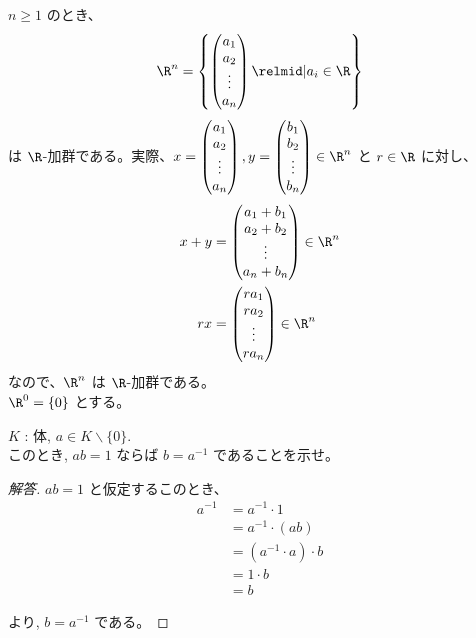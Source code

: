 \documentclass[article,paper=a4paper]{jlreq}
\begin{document}
\begin{ex}
  $n \geq 1$ のとき、
  \[\R^n = \left\{ \begin{pmatrix} a_1 \\ a_2 \\ \vdots \\ a_n \end{pmatrix} \relmid | a_i \in \R \right\}\]
  は $\R$-加群である。実際、$x = \begin{pmatrix} a_1 \\ a_2 \\ \vdots \\ a_n \end{pmatrix}, y = \begin{pmatrix} b_1 \\ b_2 \\ \vdots \\ b_n \end{pmatrix} \in \R^n$ と $r \in \R$ に対し、
\begin{align*}
  x + y &= \begin{pmatrix} a_1 + b_1 \\ a_2 + b_2 \\ \vdots \\ a_n + b_n \end{pmatrix} \in \R^n \\
  rx &= \begin{pmatrix} ra_1 \\ ra_2 \\ \vdots \\ ra_n \end{pmatrix} \in \R^n
\end{align*}
なので、$\R^n$ は $\R$-加群である。\\
\indent $\R^0 = \{0\}$ とする。
\end{ex}


\begin{exe}
  \quad $K$ : 体, $a \in K\backslash\{0\}$.\\
  このとき, $ab = 1$ ならば $b = a^{-1}$ であることを示せ。
\end{exe}
\begin{proof}[解答]
  $ab = 1$ と仮定するこのとき、
  \begin{align*}
    a^{-1} &= a^{-1}\cdot 1\\
    &= a^{-1} \cdot (ab) \\
    &= (a^{-1} \cdot a) \cdot b \\
    &= 1 \cdot b \\
    &= b
  \end{align*}

  より, $b = a^{-1}$ である。
\end{proof}
\end{document}
